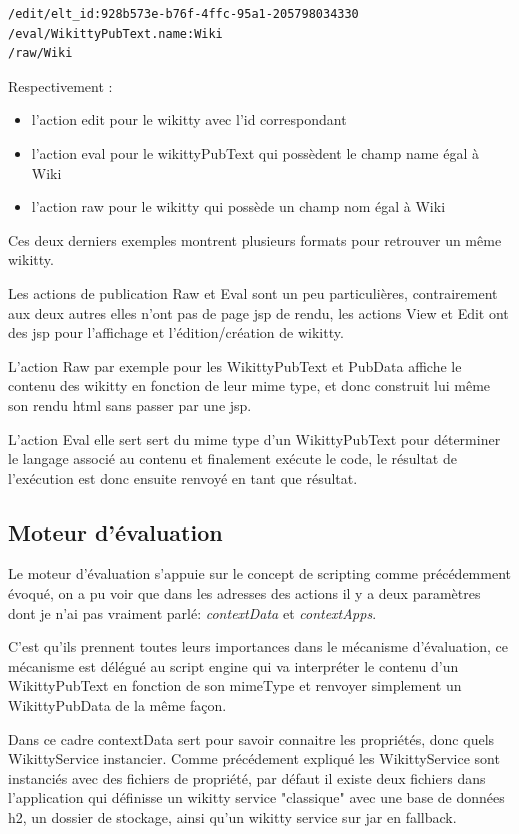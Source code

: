 \begin{verbatim}
/edit/elt_id:928b573e-b76f-4ffc-95a1-205798034330 
/eval/WikittyPubText.name:Wiki
/raw/Wiki
\end{verbatim}


Respectivement :
\begin{itemize}
\item l'action edit pour le wikitty avec l'id correspondant
\item l'action eval pour le wikittyPubText qui possèdent le champ name égal à
Wiki
\item l'action raw pour le wikitty qui possède un champ nom égal à Wiki
\end{itemize}

Ces deux derniers exemples montrent plusieurs formats pour retrouver un même
wikitty. 

Les actions de publication Raw et Eval sont un peu particulières, contrairement
aux deux autres elles n'ont pas de page jsp de rendu, les actions View et Edit
ont des jsp pour l'affichage et l'édition/création de wikitty.

L'action Raw par exemple pour les WikittyPubText et PubData affiche le contenu
des wikitty en fonction de leur mime type, et donc construit lui même son rendu
html sans passer par une jsp.

L'action Eval elle sert sert du mime type d'un WikittyPubText pour déterminer le
langage associé au contenu et finalement exécute le code, le résultat de
l'exécution est donc ensuite renvoyé en tant que résultat.

\subsection{Moteur d'évaluation}

Le moteur d'évaluation s'appuie sur le concept de scripting comme précédemment 
évoqué, on a pu voir que dans les adresses des actions il y a deux paramètres
dont je n'ai pas vraiment parlé: \emph{contextData} et \emph{contextApps}.

C'est qu'ils prennent toutes leurs importances dans le mécanisme d'évaluation,
ce mécanisme est délégué au script engine qui va interpréter le contenu
d'un WikittyPubText en fonction de son mimeType et renvoyer simplement un 
WikittyPubData de la même façon.

Dans ce cadre contextData sert pour savoir connaitre les propriétés, donc
quels WikittyService instancier. Comme précédement expliqué les WikittyService 
sont instanciés avec des fichiers de propriété, par défaut il existe deux fichiers
dans l'application qui définisse un wikitty service "classique" avec une base
de données h2, un dossier de stockage, ainsi qu'un wikitty service sur jar
en fallback. 

